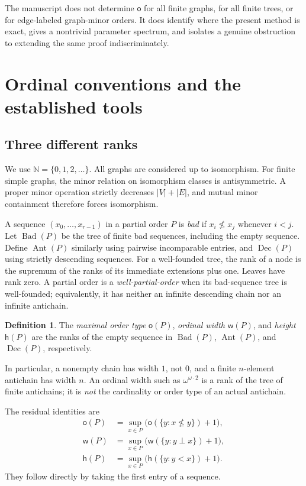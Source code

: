 \documentclass[11pt,letterpaper]{article}
\theoremstyle{plain}
\theoremstyle{definition}
\newtheorem{definition}[definition]{Definition}
\theoremstyle{remark}
\newcommand{\N}{\mathbb N}
\newcommand{\mot}{\mathsf o}
\newcommand{\wid}{\mathsf w}
\newcommand{\hei}{\mathsf h}
\begin{document}
The manuscript does not determine $\mot$ for all finite graphs, for all
finite trees, or for edge-labeled graph-minor orders. It does identify where
the present method is exact, gives a nontrivial parameter spectrum, and
isolates a genuine obstruction to extending the same proof indiscriminately.

\section{Ordinal conventions and the established tools}\label{sec:prelim}

\subsection{Three different ranks}

We use $\N=\{0,1,2,\ldots\}$. All graphs are considered up to isomorphism. For finite simple graphs, the
minor relation on isomorphism classes is antisymmetric. A proper minor
operation strictly decreases $|V|+|E|$, and mutual minor containment
therefore forces isomorphism.

A sequence $(x_0,\ldots,x_{r-1})$ in a partial order $P$ is \emph{bad} if
$x_i\not\le x_j$ whenever $i<j$. Let $\operatorname{Bad}(P)$ be the tree of
finite bad sequences, including the empty sequence. Define
$\operatorname{Ant}(P)$ similarly using pairwise incomparable entries, and
$\operatorname{Dec}(P)$ using strictly descending sequences. For a
well-founded tree, the rank of a node is the supremum of the ranks of its
immediate extensions plus one. Leaves have rank zero. A partial order is a \emph{well-partial-order}
when its bad-sequence tree is well-founded; equivalently, it has neither
an infinite descending chain nor an infinite antichain.

\begin{definition}
The \emph{maximal order type} $\mot(P)$, \emph{ordinal width} $\wid(P)$,
and \emph{height} $\hei(P)$ are the ranks of the empty sequence in
$\operatorname{Bad}(P)$, $\operatorname{Ant}(P)$, and
$\operatorname{Dec}(P)$, respectively.
\end{definition}

In particular, a nonempty chain has width $1$, not $0$, and a finite
$n$-element antichain has width $n$. An ordinal width such as
$\omega^{\omega\cdot2}$ is a rank of the tree of finite antichains; it is
\emph{not} the cardinality or order type of an actual antichain.

The residual identities are
\begin{align}
\mot(P)&=\sup_{x\in P}\bigl(\mot(\{y:x\not\le y\})+1\bigr),\label{eq:motres}\\
\wid(P)&=\sup_{x\in P}\bigl(\wid(\{y:y\perp x\})+1\bigr),\label{eq:widres}\\
\hei(P)&=\sup_{x\in P}\bigl(\hei(\{y:y<x\})+1\bigr).\label{eq:heightres}
\end{align}
They follow directly by taking the first entry of a sequence.
\end{document}
